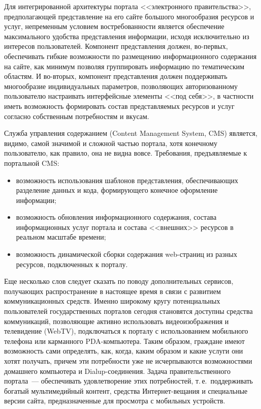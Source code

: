 \begin{multicols}{2}
Для интегрированной архитектуры портала <<электронного правительства>>,
предполагающей представление на его сайте большого многообразия ресурсов и услуг,
непременным условием востребованности является обеспечение 
максимального удобства
представления информации, исходя исклю\-чи\-тель\-но из интересов пользователей.
Компонент представления должен, во-пер\-вых, обеспечивать гибкие возможности по
размещению информа\-ци\-он\-но\-го содержания на сайте, как минимум позволяя группировать
информацию по тематическим областям. И во-вто\-рых, компонент пред\-став\-ле\-ния должен
поддерживать многообразие инди\-ви\-ду\-аль\-ных параметров, позволяющих авторизованному
пользователю настраивать интерфейсные элементы <<под себя>>, в частности иметь
возможность формировать состав представляемых ресурсов и услуг согласно
собственным потребностям и вкусам.

Служба управления содержанием (Content Management System, CMS) является, видимо,
самой значимой и сложной частью портала, хотя конечному пользователю, как правило,
она не видна вовсе. Требования, предъявляемые к портальной CMS:
{

}
\begin{itemize}
\item возможность использования шаблонов представления, обеспечивающих
разделение данных и кода, формирующего конечное оформление информации;
\item возможность обновления информационного содержания, состава
информационных услуг портала и состава <<внешних>> ресурсов в реальном
масштабе времени;
\item возможность динамической сборки содержания web-страниц из разных ресурсов,
подключенных к порталу.
\end{itemize}

Еще несколько слов следует сказать по \mbox{поводу} дополнительных сервисов, получающих
рас\-про\-стра\-не\-ние в настоящее время в связи с развитием коммуникационных средств.
Именно
 \mbox{широкому} кругу потенциальных пользователей госу\-дар\-ст\-вен\-ных порталов
сегодня становятся доступны средства коммуникаций, позволяющие актив\-но
использовать видеоизображения и телевидение (WebTV), подключаться к порталу с
использованием мобильного телефона или карманного PDA-ком\-пью\-те\-ра. Таким образом,
граждане имеют возмож\-ность сами определять, как, когда, каким образом и какие услуги
они хотят получать, причем эти потребности уже не исчерпываются возмож\-но\-стя\-ми
домашнего компьютера и Dialup-со\-еди\-не\-ния. Задача правительственного портала~---
обеспечивать удовлетворение этих потребностей, т.\,е.\ поддерживать богатый
мультимедийный контент, средства Ин\-тер\-нет-ве\-ща\-ния и специальные версии сайта,
предназначенные для просмотра с мобильных устройств.


\end{multicols}
